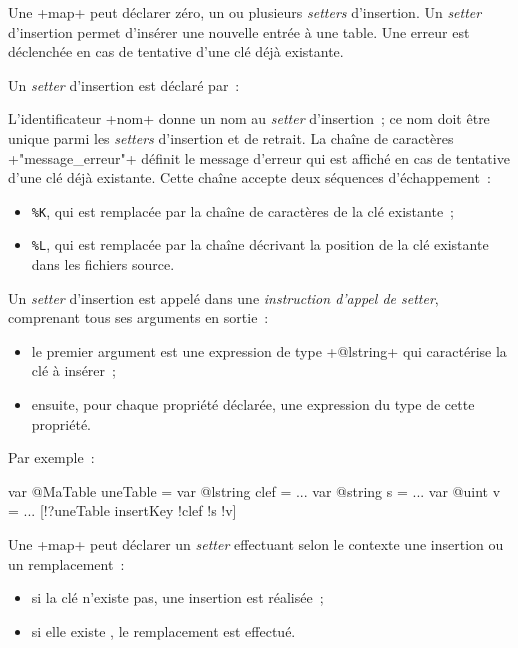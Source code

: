 
Une \ggs+map+ peut déclarer zéro, un ou plusieurs \emph{setters} d'insertion. Un \emph{setter} d'insertion permet d'insérer une nouvelle entrée à une table. Une erreur est déclenchée en cas de tentative d'une clé déjà existante.


Un \emph{setter} d'insertion est déclaré par~:

\begin{galgas}
\end{galgas}

L'identificateur \ggs+nom+ donne un nom au \emph{setter} d'insertion~; ce nom doit être unique parmi les \emph{setters} d'insertion et de retrait. La chaîne de caractères \ggs+"message_erreur"+ définit le message d'erreur qui est affiché en cas de tentative d'une clé déjà existante. Cette chaîne accepte deux séquences d'échappement~:
\begin{itemize}
  \item \texttt{\%K}, qui est remplacée par la chaîne de caractères de la clé existante~;
  \item \texttt{\%L}, qui est remplacée par la chaîne décrivant la position de la clé existante dans les fichiers source.
\end{itemize}


Un \emph{setter} d'insertion est appelé dans une \emph{instruction d'appel de setter}, comprenant tous ses arguments en sortie~:
\begin{itemize}
  \item le premier argument est une expression de type \ggs+@lstring+ qui caractérise la clé à insérer~;
  \item ensuite, pour chaque propriété déclarée, une expression du type de cette propriété.
\end{itemize}

Par exemple~:
\begin{galgas}
var @MaTable uneTable = {}
var @lstring clef = ...
var @string s = ...
var @uint v = ...
[!?uneTable insertKey !clef !s !v]
\end{galgas}










Une \ggs+map+ peut déclarer un \emph{setter} effectuant selon le contexte une insertion ou un remplacement~:
\begin{itemize}
  \item si la clé n'existe pas, une insertion est réalisée~;
  \item si elle existe , le remplacement est effectué.
\end{itemize}

